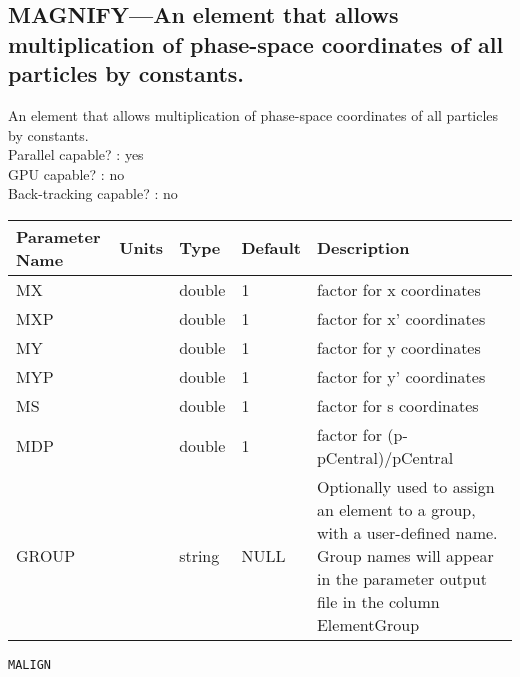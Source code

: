 \subsection{MAGNIFY---An element that allows multiplication of phase-space coordinates of all particles by constants.}
An element that allows multiplication of phase-space coordinates of all particles by constants.
\\
Parallel capable? : yes\\
GPU capable? : no\\
Back-tracking capable? : no\\
\begin{tabular}{|l|l|l|l|p{\descwidth}|} \hline
Parameter Name & Units & Type & Default & Description \\ \hline 
MX &  & double &   1 & factor for x coordinates  \\ \hline 
MXP &  & double &   1 & factor for x' coordinates  \\ \hline 
MY &  & double &   1 & factor for y coordinates  \\ \hline 
MYP &  & double &   1 & factor for y' coordinates  \\ \hline 
MS &  & double &   1 & factor for s coordinates  \\ \hline 
MDP &  & double &   1 & factor for (p-pCentral)/pCentral  \\ \hline 
GROUP &  & string & NULL & Optionally used to assign an element to a group, with a user-defined name.  Group names will appear in the parameter output file in the column ElementGroup  \\ \hline 
\end{tabular}

\newpage
\begin{center}{\Large\verb|MALIGN|}\end{center}
